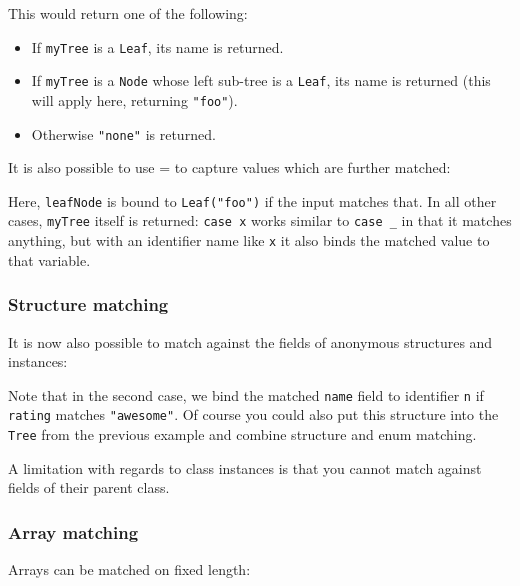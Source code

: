 \documentclass{article}
\newcommand{\type}[1]{\texttt{#1}}
\newcommand{\expr}[1]{\texttt{#1}}
\newcommand{\haxe}[2][]{%
}
\begin{document}
\haxe[firstline=22,lastline=28]{assets/PatternMatching.hx}

This would return one of the following:

\begin{itemize}
	\item If \expr{myTree} is a \expr{Leaf}, its name is returned.
	\item If \expr{myTree} is a \expr{Node} whose left sub-tree is a \expr{Leaf}, its name is returned (this will apply here, returning \expr{"foo"}).
	\item Otherwise \expr{"none"} is returned.
\end{itemize}

It is also possible to use = to capture values which are further matched:

\haxe[firstline=30,lastline=34]{assets/PatternMatching.hx}

Here, \expr{leafNode} is bound to \expr{Leaf("foo")} if the input matches that. In all other cases, \expr{myTree} itself is returned: \expr{case x} works similar to \expr{case _} in that it matches anything, but with an identifier name like \expr{x} it also binds the matched value to that variable.

\subsubsection{Structure matching}

It is now also possible to match against the fields of anonymous structures and instances:

\haxe[firstline=36,lastline=42]{assets/PatternMatching.hx}

Note that in the second case, we bind the matched \expr{name} field to identifier \expr{n} if \expr{rating} matches \expr{"awesome"}. Of course you could also put this structure into the \type{Tree} from the previous example and combine structure and enum matching.

A limitation with regards to class instances is that you cannot match against fields of their parent class.

\subsubsection{Array matching}

Arrays can be matched on fixed length:

\haxe[firstline=45,lastline=53]{assets/PatternMatching.hx}
\end{document}
